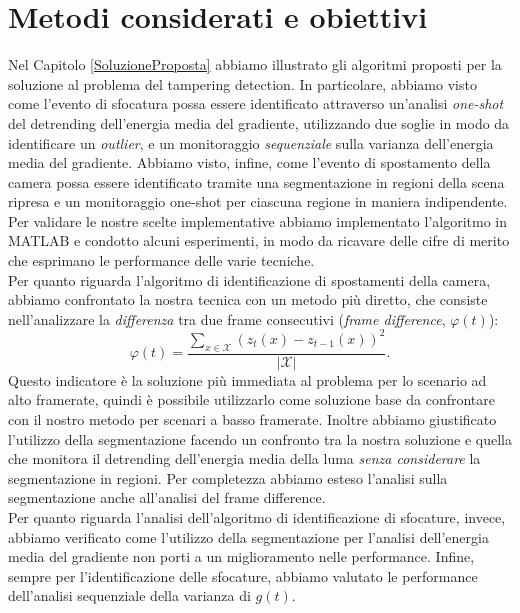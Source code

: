\section{Metodi considerati e obiettivi}
\label{obiettivi}
Nel Capitolo \ref{SoluzioneProposta} abbiamo illustrato gli algoritmi proposti per la soluzione al problema del tampering detection.
In particolare, abbiamo visto come l'evento di sfocatura possa essere identificato attraverso un'analisi \textit{one-shot} del detrending dell'energia media del gradiente, utilizzando due soglie in modo da identificare un \textit{outlier}, e un monitoraggio \textit{sequenziale} sulla varianza dell'energia media del gradiente.
Abbiamo visto, infine, come l'evento di spostamento della camera possa essere identificato tramite una segmentazione in regioni della scena ripresa e un monitoraggio one-shot per ciascuna regione in maniera indipendente.\\
Per validare le nostre scelte implementative abbiamo implementato l'algoritmo in MATLAB \cite{matlab} e condotto alcuni esperimenti, in modo da ricavare delle cifre di merito che esprimano le performance delle varie tecniche.\\
Per quanto riguarda l'algoritmo di identificazione di spostamenti della camera, abbiamo confrontato la nostra tecnica con un metodo pi\`u diretto, che consiste nell'analizzare la \textit{differenza} tra due frame consecutivi (\textit{frame difference}, $\varphi(t)$):
\begin{equation}
	\label{eq:frameDiff}
	\varphi(t) = \frac{\sum_{x \in \mathcal{X}}(z_t(x) - z_{t-1}(x))^2}{|\mathcal{X}|}.
\end{equation}
Questo indicatore \`e la soluzione pi\`u immediata al problema per lo scenario ad alto framerate, quindi \`e possibile utilizzarlo come soluzione base da confrontare con il nostro metodo per scenari a basso framerate.
Inoltre abbiamo giustificato l'utilizzo della segmentazione facendo un confronto tra la nostra soluzione e quella che monitora il detrending dell'energia media della luma \textit{senza considerare} la segmentazione in regioni.
Per completezza abbiamo esteso l'analisi sulla segmentazione anche all'analisi del frame difference.\\
Per quanto riguarda l'analisi dell'algoritmo di identificazione di sfocature, invece, abbiamo verificato come l'utilizzo della segmentazione per l'analisi dell'energia media del gradiente non porti a un miglioramento nelle performance.
Infine, sempre per l'identificazione delle sfocature, abbiamo valutato le performance dell'analisi sequenziale della varianza di $g(t)$.
